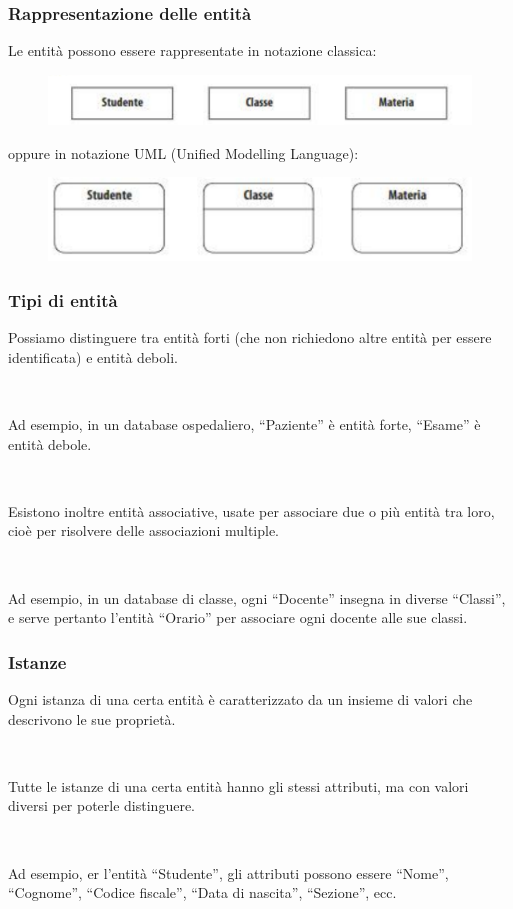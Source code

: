 \documentclass[]{beamer}
\begin{document}
\begin{frame}
\frametitle{Rappresentazione delle entità}
Le entità possono essere rappresentate in \alert<1>{notazione classica}:
\begin{figure}
  \includegraphics[width=.6\columnwidth]{img/entitastd.png}
\end{figure}
oppure in \alert<1>{notazione UML} (Unified Modelling Language):
\begin{figure}
  \includegraphics[width=.6\columnwidth]{img/entitauml.png}
\end{figure}
\end{frame}



\begin{frame}
\frametitle{Tipi di entità}
Possiamo distinguere tra \alert<1>{entità forti} (che non richiedono altre entità per essere identificata) e \alert<1>{entità deboli}.\pause

~

Ad esempio, in un database ospedaliero, ``Paziente'' è entità forte, ``Esame'' è entità debole.\pause

~

Esistono inoltre \alert<3>{entità associative}, usate per associare due o più entità tra loro, cioè per risolvere delle associazioni multiple.\pause

~

Ad esempio, in un database di classe, ogni ``Docente'' insegna in diverse ``Classi'', e serve pertanto l'entità ``Orario'' per associare ogni docente alle sue classi.
\end{frame}



\begin{frame}
\frametitle{Istanze}
Ogni istanza di una certa entità è caratterizzato da un \alert<1>{insieme di valori che descrivono le sue proprietà}.\pause

~

Tutte le istanze di una certa entità hanno gli stessi attributi, ma con valori diversi per poterle distinguere.\pause

~

Ad esempio, er l'entità ``Studente'', gli attributi possono essere ``Nome'', ``Cognome'', ``Codice fiscale'', ``Data di nascita'', ``Sezione'', ecc.
\end{frame}
\end{document}

